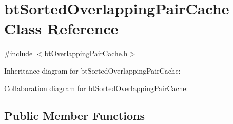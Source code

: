 \hypertarget{classbt_sorted_overlapping_pair_cache}{\section{bt\+Sorted\+Overlapping\+Pair\+Cache Class Reference}
\label{classbt_sorted_overlapping_pair_cache}
}


{\ttfamily \#include $<$bt\+Overlapping\+Pair\+Cache.\+h$>$}



Inheritance diagram for bt\+Sorted\+Overlapping\+Pair\+Cache\+:


Collaboration diagram for bt\+Sorted\+Overlapping\+Pair\+Cache\+:
\subsection*{Public Member Functions}
